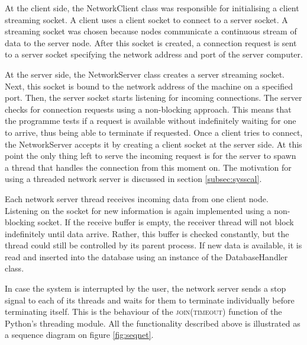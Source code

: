At the client side, the \textsf{NetworkClient} class was responsible for initialising a client streaming socket. A client uses a client socket to connect to a server socket. A streaming socket was chosen because nodes communicate a continuous stream of data to the server node. After this socket is created, a connection request is sent to a server socket specifying the network address and port of the server computer.

At the server side, the \textsf{NetworkServer} class creates a server streaming socket. Next, this socket is bound to the network address of the machine on a specified port. Then, the server socket starts listening for incoming connections. The server checks for connection requests using a non-blocking approach. This means that the programme tests if a request is available without indefinitely waiting for one to arrive, thus being able to terminate if requested. Once a client tries to connect, the \textsf{NetworkServer} accepts it by creating a client socket at the server side. At this point the only thing left to serve the incoming request is for the server to spawn a thread that handles the connection from this moment on. The motivation for using a threaded network server is discussed in section \ref{subsec:sysscal}.

Each network server thread receives incoming data from one client node. Listening on the socket for new information is again implemented using a non-blocking socket. If the receive buffer is empty, the receiver thread will not block indefinitely until data arrive. Rather, this buffer is checked constantly, but the thread could still be controlled by its parent process. If new data is available, it is read and inserted into the database using an instance of the \textsf{DatabaseHandler} class.

In case the system is interrupted by the user, the network server sends a stop signal to each of its threads and waits for them to terminate individually before terminating itself. This is the behaviour of the \textsc{join(timeout)} function of the Python's \textsf{threading} module. All the functionality described above is illustrated as a sequence diagram on figure
\ref{fig:seqnet}.

